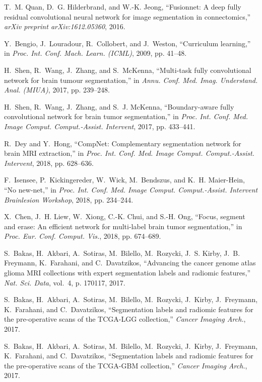 \documentclass[journal,twoside]{IEEEtran}
\begin{document}
\begin{thebibliography}{55}
T.~M. Quan, D.~G. Hilderbrand, and W.-K. Jeong, ``Fusionnet: A deep fully residual convolutional neural network for image segmentation in connectomics,'' \emph{arXiv preprint arXiv:1612.05360}, 2016.

Y.~Bengio, J.~Louradour, R.~Collobert, and J.~Weston, ``Curriculum learning,'' in \emph{ Proc. Int. Conf. Mach. Learn. (ICML)}, 2009, pp. 41--48.

H.~Shen, R.~Wang, J.~Zhang, and S.~McKenna, ``Multi-task fully convolutional network for brain tumour segmentation,'' in \emph{Annu. Conf. Med. Imag. Understand. Anal. (MIUA)}, 2017, pp. 239--248.

H.~Shen, R.~Wang, J.~Zhang, and S.~J. McKenna, ``Boundary-aware fully convolutional network for brain tumor segmentation,'' in \emph{Proc. Int. Conf. Med. Image Comput. Comput.-Assist. Intervent}, 2017, pp. 433--441.

R.~Dey and Y.~Hong, ``Comp{N}et: Complementary segmentation network for brain {MRI} extraction,'' in \emph{Proc. Int. Conf. Med. Image Comput. Comput.-Assist. Intervent}, 2018, pp. 628--636.



F.~Isensee, P.~Kickingereder, W.~Wick, M.~Bendszus, and K.~H. Maier-Hein, ``No new-net,'' in \emph{Proc. Int. Conf. Med. Image Comput. Comput.-Assist. Intervent Brainlesion Workshop}, 2018, pp. 234--244.

X.~Chen, J.~H. Liew, W.~Xiong, C.-K. Chui, and S.-H. Ong, ``Focus, segment and erase: An efficient network for multi-label brain tumor segmentation,'' in \emph{Proc. Eur. Conf. Comput. Vis.}, 2018, pp.
674--689.


S.~Bakas, H.~Akbari, A.~Sotiras, M.~Bilello, M.~Rozycki, J.~S. Kirby, J.~B. Freymann, K.~Farahani, and C.~Davatzikos, ``Advancing the cancer genome atlas glioma {MRI} collections with expert segmentation labels and radiomic features,'' \emph{Nat. Sci. Data}, vol.~4, p. 170117, 2017.

S.~Bakas, H.~Akbari, A.~Sotiras, M.~Bilello, M.~Rozycki, J.~Kirby, J.~Freymann, K.~Farahani, and C.~Davatzikos, ``Segmentation labels and radiomic features for the pre-operative scans of the {TCGA-LGG} collection,'' \emph{Cancer Imaging Arch.}, 2017.

S.~Bakas, H.~Akbari, A.~Sotiras, M.~Bilello, M.~Rozycki, J.~Kirby, J.~Freymann, K.~Farahani, and C.~Davatzikos, ``Segmentation labels and radiomic features for the pre-operative scans of the {TCGA-GBM} collection,'' \emph{Cancer Imaging Arch.}, 2017.


\end{thebibliography}
\end{document}
